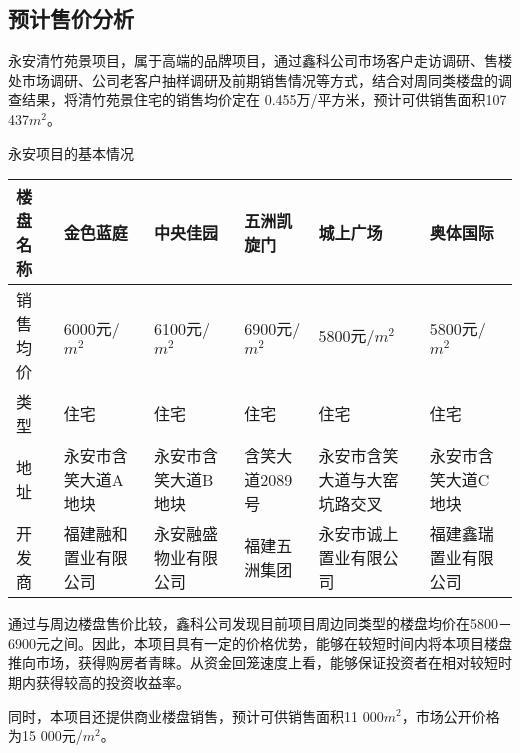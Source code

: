 \subsection{预计售价分析}
永安清竹苑景项目，属于高端的品牌项目，通过鑫科公司市场客户走访调研、售楼处市场调研、公司老客户抽样调研及前期销售情况等方式，结合对周同类楼盘的调查结果，将清竹苑景住宅的销售均价定在 0.455万/平方米，预计可供销售面积107 437$m^2$。
  \begin{center}
  \renewcommand*{\arraystretch}{0.6}
  \setlength{\tabcolsep}{8pt}
  \begin{threeparttable}\vspace{-1.0cm}
 \caption{永安项目的基本情况}
 \renewcommand{\arraystretch}{1.1} \arrayrulewidth=0.8pt 
 	 \begin{tabular}{>{\scriptsize}p{1.2cm}>{\scriptsize}p{2cm}>{\scriptsize}p{2cm}>{\scriptsize}p{2cm}>{\scriptsize}p{2cm}>{\scriptsize}p{2cm}}
	\hline\hline
\rowcolor{mycyan}	楼盘名称	&	金色蓝庭	&	中央佳园	&	五洲凯旋门	&	城上广场	&	奥体国际	\\
	\hline \renewcommand{\arraystretch}{.8}
销售均价	&	6000元/$m^2$	&	6100元/$m^2$	&	6900元/$m^2$	&	5800元/$m^2$	&	5800元/$m^2$	\\
类型	&	住宅	&	住宅	&	住宅	&	住宅	&	住宅	\\
地址	&	永安市含笑大道A地块	&	永安市含笑大道B地块	&	含笑大道2089号	&	永安市含笑大道与大窑坑路交叉	&	永安市含笑大道C地块	\\
开发商	&	福建融和置业有限公司	&	永安融盛物业有限公司	&	福建五洲集团	&	永安市诚上置业有限公司	&	福建鑫瑞置业有限公司	\\
	\bottomrule
	\end{tabular}
\end{threeparttable}
\end{center}
\begin{note}
通过与周边楼盘售价比较，鑫科公司发现目前项目周边同类型的楼盘均价在5800－6900元之间。因此，本项目具有一定的价格优势，能够在较短时间内将本项目楼盘推向市场，获得购房者青睐。从资金回笼速度上看，能够保证投资者在相对较短时期内获得较高的投资收益率。
\end{note}
同时，本项目还提供商业楼盘销售，预计可供销售面积11 000$m^2$，市场公开价格为15 000元/$m^2$。


